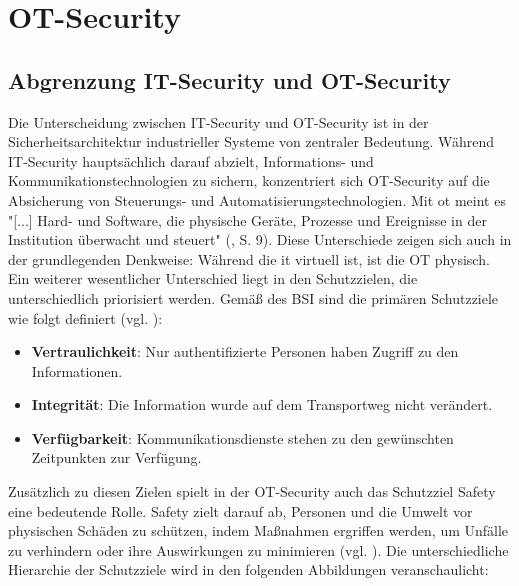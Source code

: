 \section{OT-Security}

\subsection{Abgrenzung IT-Security und OT-Security}

Die Unterscheidung zwischen IT-Security und OT-Security ist in der Sicherheitsarchitektur industrieller Systeme von zentraler Bedeutung. Während IT-Security hauptsächlich darauf abzielt, Informations- und Kommunikationstechnologien zu sichern, konzentriert sich OT-Security auf die Absicherung von Steuerungs- und Automatisierungstechnologien. Mit \ac{ot} meint es "[...] Hard- und Software, die physische Geräte, Prozesse und Ereignisse in der Institution überwacht und steuert" (\cite {ICS}, S. 9). Diese Unterschiede zeigen sich auch in der grundlegenden Denkweise: Während die \ac{it} virtuell ist, ist die OT physisch. Ein weiterer wesentlicher Unterschied liegt in den Schutzzielen, die unterschiedlich priorisiert werden. Gemäß des BSI sind die primären Schutzziele wie folgt definiert (vgl. \cite{BSI}): 
\begin{itemize}
\item \textbf{Vertraulichkeit}: Nur authentifizierte Personen haben Zugriff zu den Informationen.
\item \textbf{Integrität}: Die Information wurde auf dem Transportweg nicht verändert.
\item \textbf{Verfügbarkeit}: Kommunikationsdienste stehen zu den gewünschten Zeitpunkten zur Verfügung.
\end{itemize}
Zusätzlich zu diesen Zielen spielt in der OT-Security auch das Schutzziel Safety eine bedeutende Rolle. Safety zielt darauf ab, Personen und die Umwelt vor physischen Schäden zu schützen, indem Maßnahmen ergriffen werden, um Unfälle zu verhindern oder ihre Auswirkungen zu minimieren (vgl. \cite{Safety}). Die unterschiedliche Hierarchie der Schutzziele wird in den folgenden Abbildungen veranschaulicht:
